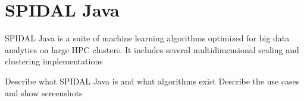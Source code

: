 \chapter{\acl{SPIDAL} Java}
\label{ch:spidaljava}

\ac{SPIDAL} Java is a suite of machine learning algorithms optimized for big data analytics on large \ac{HPC} clusters. It includes several multidimensional scaling and clustering implementations


Describe what SPIDAL Java is and what algorithms exist
Describe the use cases and show screenshots